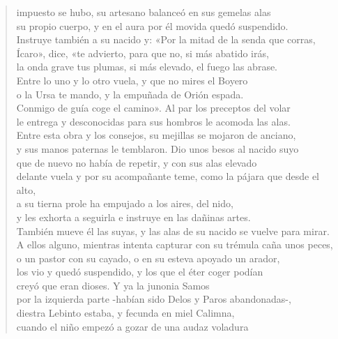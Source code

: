 \begin{quote}
{{            impuesto se hubo, su artesano balanceó en sus gemelas alas\\
            su propio cuerpo, y en el aura por él movida quedó suspendido.\\
            Instruye también a su nacido y: «Por la mitad de la senda que corras,\\
            Ícaro», dice, «te advierto, para que no, si más abatido irás,\\
            la onda grave tus plumas, si más elevado, el fuego las abrase.\\
            Entre lo uno y lo otro vuela, y que no mires el Boyero\\
            o la Ursa te mando, y la empuñada de Orión espada.\\
            Conmigo de guía coge el camino». Al par los preceptos del volar\\
            le entrega y desconocidas para sus hombros le acomoda las alas.\\
            Entre esta obra y los consejos, su mejillas se mojaron de anciano,\\
            y sus manos paternas le temblaron. Dio unos besos al nacido suyo\\
            que de nuevo no había de repetir, y con sus alas elevado\\
            delante vuela y por su acompañante teme, como la pájara que desde el alto,\\
            a su tierna prole ha empujado a los aires, del nido,\\
            y les exhorta a seguirla e instruye en las dañinas artes.\\
            También mueve él las suyas, y las alas de su nacido se vuelve para mirar.\\
            A ellos alguno, mientras intenta capturar con su trémula caña unos peces,\\
            o un pastor con su cayado, o en su esteva apoyado un arador,\\
            los vio y quedó suspendido, y los que el éter coger podían\\
            creyó que eran dioses. Y ya la junonia Samos\\
            por la izquierda parte -habían sido Delos y Paros abandonadas-,\\
            diestra Lebinto estaba, y fecunda en miel Calimna,\\
            cuando el niño empezó a gozar de una audaz voladura\\
}}
\end{quote}
